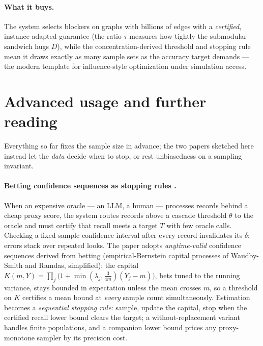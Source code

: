 \paragraph{What it buys.}
The system selects blockers on graphs with billions of edges with a \emph{certified},
instance-adapted guarantee (the ratio $\tau$ measures how tightly the submodular sandwich hugs
$D$), while the concentration-derived threshold and stopping rule mean it draws exactly as
many sample sets as the accuracy target demands --- the modern template for
influence-style optimization under simulation access.

\section{Advanced usage and further reading}
\label{sec:est-advanced}

Everything so far fixes the sample size in advance; the two papers sketched here instead let
the \emph{data} decide when to stop, or rest unbiasedness on a sampling invariant.

\paragraph{Betting confidence sequences as stopping rules \citep{sigmod26-293}.}
When an expensive oracle --- an LLM, a human --- processes records behind a cheap proxy
score, the system routes records above a cascade threshold $\theta$ to the oracle and
must certify that recall meets a target $T$ with few oracle calls. Checking a fixed-sample
confidence interval after every record invalidates its $\delta$: errors stack over
repeated looks. The paper adopts \emph{anytime-valid} confidence sequences derived from
betting (empirical-Bernstein capital processes of Waudby-Smith and Ramdas, simplified):
the capital $K(m,Y) = \prod_j \bigl(1 + \min(\lambda_j, \tfrac{3}{4m})(Y_j - m)\bigr)$,
bets tuned to the running variance, stays bounded in expectation unless the mean crosses
$m$, so a threshold on $K$ certifies a mean bound at \emph{every} sample count
simultaneously. Estimation becomes a \emph{sequential stopping rule}: sample, update the
capital, stop when the certified recall lower bound clears the target; a
without-replacement variant handles finite populations, and a companion lower bound
prices any proxy-monotone sampler by its precision cost.

